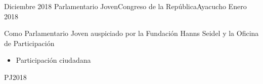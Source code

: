   \experience
  {Diciembre 2018}  {Parlamentario Joven}{Congreso de la República}{Ayacucho}
  {Enero 2018}   {
    Como Parlamentario Joven auspiciado por la Fundación Hanns Seidel y la Oficina de Participación %
    \begin{itemize}
      \item Participación ciudadana
    \end{itemize}
  }
  {PJ2018}
